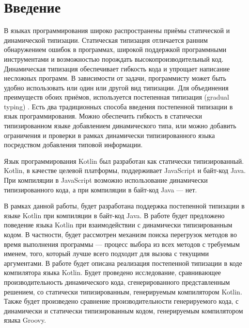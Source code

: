 \section*{Введение}

В языках программирования широко распространены приёмы статической и динамической типизации. Статическая типизация отличается ранним обнаружением ошибок в программах, широкой поддержкой программными инструментами и возможностью порождать высокопроизводительный код. Динамическая типизация обеспечивает гибкость кода и упрощает написание несложных программ. 
В зависимости от задачи, программисту может быть удобно использовать или один или другой вид типизации. Для объединения преимуществ обоих приёмов, используется постепенная типизация (gradual typing) \cite{gradual:siek2006gradual}. Есть два традиционных способа введения постепенной типизации в язык программирования. Можно обеспечить гибкость в статически типизированном языке добавлением динамического типа, или можно добавить ограничения и проверки в рамках динамически типизированного языка посредством добавления типовой информации.

Язык программирования Kotlin был разработан как статически типизированный.
Kotlin, в качестве целевой платформы, поддерживает JavaScript и байт-код Java. При компиляции в JavaScript возможно использование динамически типизированного кода, а при компиляции в байт-код Java --- нет.

В рамках данной работы, будет разработана поддержка постепенной типизации в языке Kotlin при компиляции в байт-код Java. 
В работе будет предложено поведение языка Kotlin при взаимодействии с динамически типизированным кодом. В частности, будет рассмотрен механизм поиска перегрузок методов во время выполнения программы --- процесс выбора из всех методов с требуемым именем, того, который лучше всего подходит для вызова с текущими аргументами. В работе будет описана реализация постепенной типизации в коде компилятора языка Kotlin. Будет проведено исследование, сравнивающее производительность динамического кода, сгенерированного представленным решением, со статически типизированным, генерируемым компилятором Kotlin. Также будет произведено сравнение производительности генерируемого кода, с динамически и статически типизированным кодом, генерируемым компилятором языка Groovy. 



